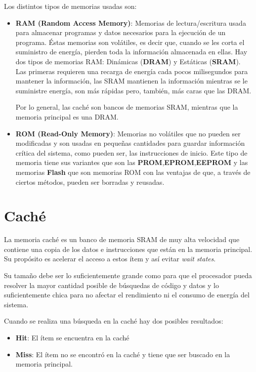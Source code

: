 Los distintos tipos de memorias usadas son:
\begin{itemize}
	\item \textbf{RAM (Random Access Memory)}: Memorias de lectura/escritura usada para almacenar programas y datos necesarios para la ejecución de un programa. Éstas memorias son volátiles, es decir que, cuando se les corta el suministro de energía, pierden toda la información almacenada en ellas.
	Hay dos tipos de memorias RAM: Dinámicas (\textbf{DRAM}) y Estáticas (\textbf{SRAM}). Las primeras requieren una recarga de energía cada pocos milisegundos para mantener la información, las SRAM mantienen la información mientras se le suministre energía, son más rápidas pero, también, más caras que las DRAM.
	
	Por lo general, las caché son bancos de memorias SRAM, mientras que la memoria principal es una DRAM.
	
	\item \textbf{ROM (Read-Only Memory)}: Memorias no volátiles que no pueden ser modificadas y son usadas en pequeñas cantidades para guardar información crítica del sistema, como pueden ser, las instrucciones de inicio. Este tipo de memoria tiene sus variantes que son las \textbf{PROM},\textbf{EPROM},\textbf{EEPROM} y las memorias \textbf{Flash} que son memorias ROM con las ventajas de que, a través de ciertos métodos, pueden ser borradas y reusadas.
	
\end{itemize}

\newpage

\section{Caché}
La memoria caché es un banco de memoria SRAM de muy alta velocidad que contiene una copia de los datos e instrucciones que están en la memoria principal. Su propósito es acelerar el acceso a estos ítem y así evitar \textit{wait states}.

Su tamaño debe ser lo suficientemente grande como para que el procesador pueda resolver la mayor cantidad posible de búsquedas de código y datos y lo suficientemente chica para no afectar el rendimiento ni el consumo de energía del sistema.

Cuando se realiza una búsqueda en la caché hay dos posibles resultados:
\begin{itemize}
	\item\textbf{Hit}: El ítem se encuentra en la caché
	\item\textbf{Miss}: El ítem no se encontró en la caché y tiene que ser buscado en la memoria principal.
\end{itemize}

